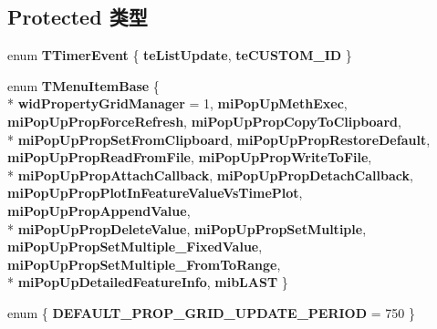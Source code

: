 \subsection*{Protected 类型}
\begin{DoxyCompactItemize}
\item 
\hypertarget{class_prop_grid_frame_base_abf93ba6a2caf761a755c4a869f982f5b}{enum {\bfseries T\+Timer\+Event} \{ {\bfseries te\+List\+Update}, 
{\bfseries te\+C\+U\+S\+T\+O\+M\+\_\+\+I\+D}
 \}}\label{class_prop_grid_frame_base_abf93ba6a2caf761a755c4a869f982f5b}

\item 
\hypertarget{class_prop_grid_frame_base_a65687054c3cdb55081be11710833210a}{enum {\bfseries T\+Menu\+Item\+Base} \{ \\*
{\bfseries wid\+Property\+Grid\+Manager} = 1, 
{\bfseries mi\+Pop\+Up\+Meth\+Exec}, 
{\bfseries mi\+Pop\+Up\+Prop\+Force\+Refresh}, 
{\bfseries mi\+Pop\+Up\+Prop\+Copy\+To\+Clipboard}, 
\\*
{\bfseries mi\+Pop\+Up\+Prop\+Set\+From\+Clipboard}, 
{\bfseries mi\+Pop\+Up\+Prop\+Restore\+Default}, 
{\bfseries mi\+Pop\+Up\+Prop\+Read\+From\+File}, 
{\bfseries mi\+Pop\+Up\+Prop\+Write\+To\+File}, 
\\*
{\bfseries mi\+Pop\+Up\+Prop\+Attach\+Callback}, 
{\bfseries mi\+Pop\+Up\+Prop\+Detach\+Callback}, 
{\bfseries mi\+Pop\+Up\+Prop\+Plot\+In\+Feature\+Value\+Vs\+Time\+Plot}, 
{\bfseries mi\+Pop\+Up\+Prop\+Append\+Value}, 
\\*
{\bfseries mi\+Pop\+Up\+Prop\+Delete\+Value}, 
{\bfseries mi\+Pop\+Up\+Prop\+Set\+Multiple}, 
{\bfseries mi\+Pop\+Up\+Prop\+Set\+Multiple\+\_\+\+Fixed\+Value}, 
{\bfseries mi\+Pop\+Up\+Prop\+Set\+Multiple\+\_\+\+From\+To\+Range}, 
\\*
{\bfseries mi\+Pop\+Up\+Detailed\+Feature\+Info}, 
{\bfseries mib\+L\+A\+S\+T}
 \}}\label{class_prop_grid_frame_base_a65687054c3cdb55081be11710833210a}

\item 
\hypertarget{class_prop_grid_frame_base_afc2ebbef6e9fad54aefe03a6900fc3d2}{enum \{ {\bfseries D\+E\+F\+A\+U\+L\+T\+\_\+\+P\+R\+O\+P\+\_\+\+G\+R\+I\+D\+\_\+\+U\+P\+D\+A\+T\+E\+\_\+\+P\+E\+R\+I\+O\+D} = 750
 \}}\label{class_prop_grid_frame_base_afc2ebbef6e9fad54aefe03a6900fc3d2}

\end{DoxyCompactItemize}
